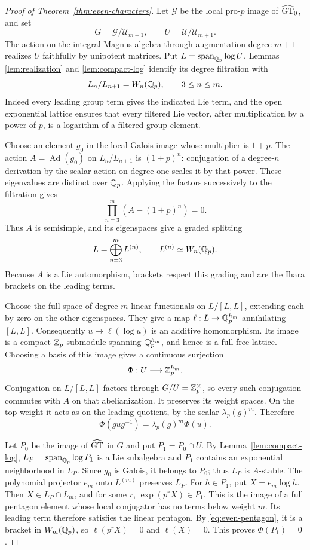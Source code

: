 \begin{proof}[Proof of Theorem~\ref{thm:even-characters}]
Let $\mathcal G$ be the local pro-$p$ image of $\widehat{\mathrm{GT}}_0$, and set
\[
 G=\mathcal G/\mathcal U_{m+1},\qquad
 U=\mathcal U/\mathcal U_{m+1}.
\]
The action on the integral Magnus algebra through augmentation degree
$m+1$ realizes $U$ faithfully by unipotent matrices.  Put
$L=\operatorname{span}_{\mathbb Q_p}\log U$.  Lemmas
\ref{lem:realization} and \ref{lem:compact-log} identify its degree
filtration with
\[
 L_n/L_{n+1}=W_n(\mathbb Q_p),\qquad 3\leq n\leq m.
\]
Indeed every leading group term gives the indicated Lie term, and the
open exponential lattice ensures that every filtered Lie vector, after
multiplication by a power of $p$, is a logarithm of a filtered group element.

Choose an element $g_0$ in the local Galois image whose multiplier is
$1+p$.  The action $A=\operatorname{Ad}(g_0)$ on $L_n/L_{n+1}$ is
$(1+p)^n$: conjugation of a degree-$n$ derivation by the scalar
action on degree one scales it by that power.  These eigenvalues are
distinct over $\mathbb Q_p$.  Applying the factors successively to the
filtration gives
\[
 \prod_{n=3}^{m}(A-(1+p)^n)=0.
\]
Thus $A$ is semisimple, and its eigenspaces give a graded splitting
\[
 L=\bigoplus_{n=3}^{m}L^{(n)},\qquad L^{(n)}\simeq W_n(\mathbb Q_p).
\]
Because $A$ is a Lie automorphism, brackets respect this grading and
are the Ihara brackets on the leading terms.

Choose the full space of degree-$m$ linear functionals on
$L/[L,L]$, extending each by zero on the other eigenspaces.  They give
a map $\ell:L\to\mathbb Q_p^{h_m}$ annihilating $[L,L]$.
Consequently $u\mapsto\ell(\log u)$ is an additive homomorphism.
Its image is a compact $\mathbb Z_p$-submodule spanning $\mathbb Q_p^{h_m}$, and
hence is a full free lattice.  Choosing a basis of this image gives a
continuous surjection
\[
 \Phi:U\longrightarrow\mathbb Z_p^{h_m}.
\]
Conjugation on $L/[L,L]$ factors through
$G/U=\mathbb Z_p^\times$, so every such conjugation commutes with $A$ on
that abelianization.  It preserves its weight spaces.  On the top
weight it acts as on the leading quotient, by the scalar
$\lambda_p(g)^m$.  Therefore
\begin{equation}
 \Phi(gug^{-1})=\lambda_p(g)^m\Phi(u).
 \label{eq:equivariance}
\end{equation}

Let $P_0$ be the image of $\widehat{\mathrm{GT}}$ in $G$ and put $P_1=P_0\cap U$.
By Lemma~\ref{lem:compact-log},
$L_P=\operatorname{span}_{\mathbb Q_p}\log P_1$ is a Lie subalgebra and
$P_1$ contains an exponential neighborhood in $L_P$.
Since $g_0$ is Galois, it belongs to $P_0$; thus $L_P$ is
$A$-stable.  The polynomial projector $e_m$ onto $L^{(m)}$ preserves
$L_P$.  For $h\in P_1$, put $X=e_m\log h$.  Then
$X\in L_P\cap L_m$, and for some $r$, $\exp(p^rX)\in P_1$.
This is the image of a full pentagon element whose local conjugator
has no terms below weight $m$.  Its leading term therefore satisfies
the linear pentagon.  By \eqref{eq:even-pentagon}, it is a bracket in
$W_m(\mathbb Q_p)$, so $\ell(p^rX)=0$ and $\ell(X)=0$.
This proves $\Phi(P_1)=0$.


\end{proof}
